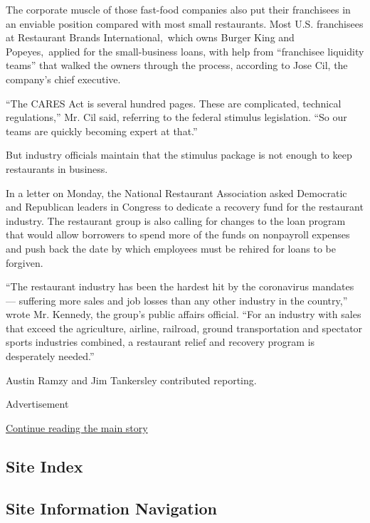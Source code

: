 The corporate muscle of those fast-food companies also put their
franchisees in an enviable position compared with most small
restaurants. Most U.S. franchisees at Restaurant Brands
International,~which owns Burger King and Popeyes,~applied for the
small-business loans, with help from ``franchisee liquidity teams'' that
walked the owners through the process, according to Jose Cil, the
company's chief executive.

``The CARES Act is several hundred pages. These are complicated,
technical regulations,'' Mr. Cil said, referring to the federal stimulus
legislation. ``So our teams are quickly becoming expert at that.''

But industry officials maintain that the stimulus package is not enough
to keep restaurants in business.

In a letter on Monday, the National Restaurant Association asked
Democratic and Republican leaders in Congress to dedicate a recovery
fund for the restaurant industry. The restaurant group is also calling
for changes to the loan program that would allow borrowers to spend more
of the funds on nonpayroll expenses and push back the date by which
employees must be rehired for loans to be forgiven.

``The restaurant industry has been the hardest hit by the coronavirus
mandates --- suffering more sales and job losses than any other industry
in the country,'' wrote Mr. Kennedy, the group's public affairs
official. ``For an industry with sales that exceed the agriculture,
airline, railroad, ground transportation and spectator sports industries
combined, a restaurant relief and recovery program is desperately
needed.''

Austin Ramzy and Jim Tankersley contributed reporting.

Advertisement

\protect\hyperlink{after-bottom}{Continue reading the main story}

\hypertarget{site-index}{%
\subsection{Site Index}\label{site-index}}

\hypertarget{site-information-navigation}{%
\subsection{Site Information
Navigation}\label{site-information-navigation}}

